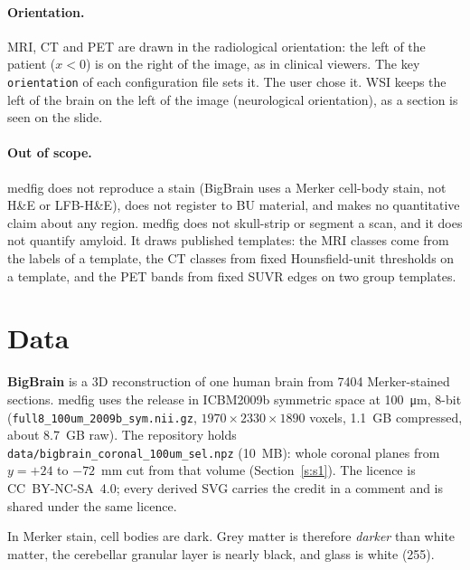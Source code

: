 \documentclass[10pt,a4paper]{article}
\newcommand{\code}[1]{\texttt{#1}}
\begin{document}
\paragraph{Orientation.} MRI, CT and PET are drawn in the radiological orientation: the left of the patient ($x<0$) is on the
right of the image, as in clinical viewers. The key \code{orientation} of each configuration file sets it. The user chose it.
WSI keeps the left of the brain on the left of the image (neurological orientation), as a section is seen on the slide.

\paragraph{Out of scope.} medfig does not reproduce a stain (BigBrain uses a Merker cell-body stain, not H\&E or LFB-H\&E),
does not register to BU material, and makes no quantitative claim about any region. medfig does not skull-strip or segment a
scan, and it does not quantify amyloid. It draws published templates: the MRI classes come from the labels of a template, the
CT classes from fixed Hounsfield-unit thresholds on a template, and the PET bands from fixed SUVR edges on two group templates.

\section{Data}\label{s:data}
\textbf{BigBrain} \cite{amunts2013} is a 3D reconstruction of one human brain from 7404 Merker-stained sections.
medfig uses the release in ICBM2009b symmetric space \cite{fonov2011} at \SI{100}{\micro\metre}, 8-bit
(\nolinkurl{full8_100um_2009b_sym.nii.gz}, $1970\times2330\times1890$ voxels, 1.1~GB compressed, about 8.7~GB raw).
The repository holds \nolinkurl{data/bigbrain_coronal_100um_sel.npz} (10~MB): \vNPlanes{} whole coronal planes from
$y=+24$ to $-72$~mm cut from that volume (Section~\ref{s:s1}). The licence is CC~BY-NC-SA~4.0; every derived SVG carries the credit
in a comment and is shared under the same licence.

In Merker stain, cell bodies are dark. Grey matter is therefore \emph{darker} than white matter, the cerebellar granular layer is
nearly black, and glass is white (255).
\end{document}
